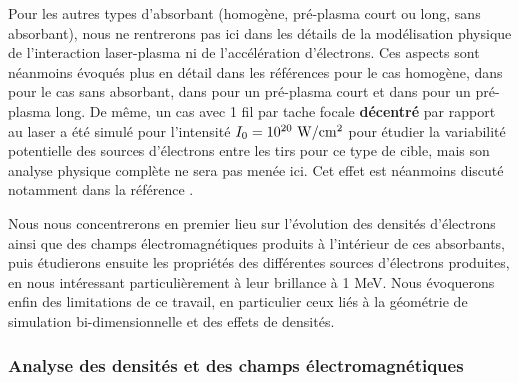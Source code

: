 \begin{refsection}
Pour les autres types d'absorbant (homogène, pré-plasma court ou long, sans absorbant), nous ne rentrerons pas ici dans les détails de la modélisation physique de l'interaction laser-plasma ni de l'accélération d'électrons. Ces aspects sont néanmoins évoqués plus en détail dans les références \parencite{pazzaglia_2020, arefiev_2016, debayle_2017a} pour le cas homogène, dans \parencite{wilks_1992a, debayle_2013b} pour le cas sans absorbant, dans \parencite{nuter_2008a, chopineau_2019} pour un pré-plasma court et dans \parencite{pukhov_1999, scott_2012a, nuter_2008a} pour un pré-plasma long. De même, un cas avec 1 fil par tache focale \textbf{décentré} par rapport au laser a été simulé pour l'intensité $I_0=10^{20} ~ \rm W/cm^2$ pour étudier la variabilité potentielle des sources d'électrons entre les tirs pour ce type de cible, mais son analyse physique complète ne sera pas menée ici. Cet effet est néanmoins discuté notamment dans la référence \parencite{jiang_2014a}.

Nous nous concentrerons en premier lieu sur l'évolution des densités d'électrons ainsi que des champs électromagnétiques produits à l'intérieur de ces absorbants, puis étudierons ensuite les propriétés des différentes sources d'électrons produites, en nous intéressant particulièrement à leur brillance à 1 MeV. Nous évoquerons enfin des limitations de ce travail, en particulier ceux liés à la géométrie de simulation bi-dimensionnelle et des effets de densités.

\subsubsection{Analyse des densités et des champs électromagnétiques}


\end{refsection}
